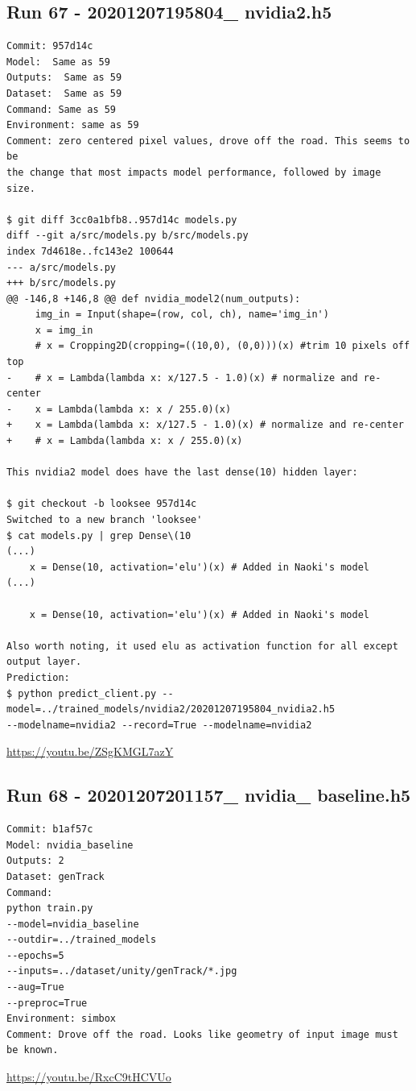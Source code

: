 \subsection{Run 67 - 20201207195804\_ nvidia2.h5}
\begin{verbatim}
Commit: 957d14c
Model:  Same as 59
Outputs:  Same as 59
Dataset:  Same as 59
Command: Same as 59
Environment: same as 59 
Comment: zero centered pixel values, drove off the road. This seems to be
the change that most impacts model performance, followed by image size.

$ git diff 3cc0a1bfb8..957d14c models.py
diff --git a/src/models.py b/src/models.py
index 7d4618e..fc143e2 100644
--- a/src/models.py
+++ b/src/models.py
@@ -146,8 +146,8 @@ def nvidia_model2(num_outputs):
     img_in = Input(shape=(row, col, ch), name='img_in')
     x = img_in
     # x = Cropping2D(cropping=((10,0), (0,0)))(x) #trim 10 pixels off top
-    # x = Lambda(lambda x: x/127.5 - 1.0)(x) # normalize and re-center
-    x = Lambda(lambda x: x / 255.0)(x)
+    x = Lambda(lambda x: x/127.5 - 1.0)(x) # normalize and re-center
+    # x = Lambda(lambda x: x / 255.0)(x)

This nvidia2 model does have the last dense(10) hidden layer:

$ git checkout -b looksee 957d14c
Switched to a new branch 'looksee'
$ cat models.py | grep Dense\(10
(...)
    x = Dense(10, activation='elu')(x) # Added in Naoki's model
(...)

    x = Dense(10, activation='elu')(x) # Added in Naoki's model

Also worth noting, it used elu as activation function for all except output layer.
Prediction:
$ python predict_client.py --model=../trained_models/nvidia2/20201207195804_nvidia2.h5
--modelname=nvidia2 --record=True --modelname=nvidia2

\end{verbatim}
\url{https://youtu.be/ZSgKMGL7azY}

\subsection{Run 68 - 20201207201157\_ nvidia\_ baseline.h5 }
\begin{verbatim}
Commit: b1af57c
Model: nvidia_baseline
Outputs: 2
Dataset: genTrack
Command:
python train.py
--model=nvidia_baseline
--outdir=../trained_models
--epochs=5
--inputs=../dataset/unity/genTrack/*.jpg
--aug=True
--preproc=True
Environment: simbox
Comment: Drove off the road. Looks like geometry of input image must be known.
\end{verbatim}
\url{https://youtu.be/RxcC9tHCVUo}



